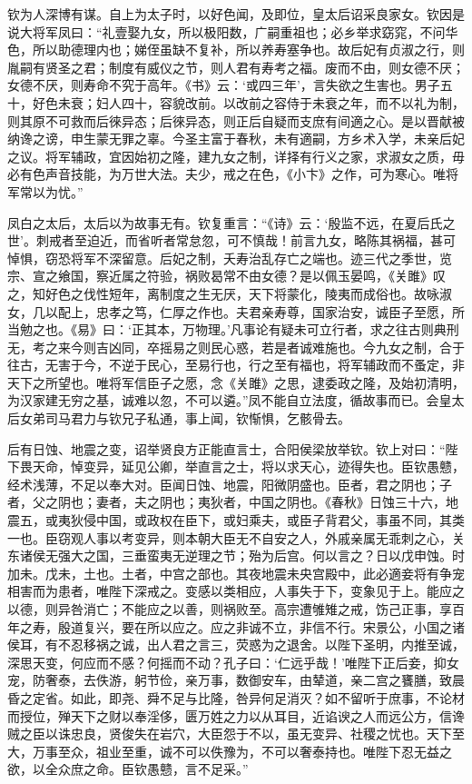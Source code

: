 \documentclass[12pt,UTF8]{ctexbook}
\begin{document}
钦为人深博有谋。自上为太子时，以好色闻，及即位，皇太后诏采良家女。钦因是说大将军凤曰：“礼壹娶九女，所以极阳数，广嗣重祖也；必乡举求窈窕，不问华色，所以助德理内也；娣侄虽缺不复补，所以养寿塞争也。故后妃有贞淑之行，则胤嗣有贤圣之君；制度有威仪之节，则人君有寿考之福。废而不由，则女德不厌；女德不厌，则寿命不究于高年。《书》云：‘或四三年’，言失欲之生害也。男子五十，好色未衰；妇人四十，容貌改前。以改前之容侍于未衰之年，而不以礼为制，则其原不可救而后徠异态；后徠异态，则正后自疑而支庶有间適之心。是以晋献被纳谗之谤，申生蒙无罪之辜。今圣主富于春秋，未有適嗣，方乡术入学，未亲后妃之议。将军辅政，宜因始初之隆，建九女之制，详择有行义之家，求淑女之质，毋必有色声音技能，为万世大法。夫少，戒之在色，《小卞》之作，可为寒心。唯将军常以为忧。”



凤白之太后，太后以为故事无有。钦复重言：“《诗》云：‘殷监不远，在夏后氏之世’。刺戒者至迫近，而省听者常怠忽，可不慎哉！前言九女，略陈其祸福，甚可悼惧，窃恐将军不深留意。后妃之制，夭寿治乱存亡之端也。迹三代之季世，览宗、宣之飨国，察近属之符验，祸败曷常不由女德？是以佩玉晏鸣，《关雎》叹之，知好色之伐性短年，离制度之生无厌，天下将蒙化，陵夷而成俗也。故咏淑女，几以配上，忠孝之笃，仁厚之作也。夫君亲寿尊，国家治安，诚臣子至愿，所当勉之也。《易》曰：‘正其本，万物理。’凡事论有疑未可立行者，求之往古则典刑无，考之来今则吉凶同，卒摇易之则民心惑，若是者诚难施也。今九女之制，合于往古，无害于今，不逆于民心，至易行也，行之至有福也，将军辅政而不蚤定，非天下之所望也。唯将军信臣子之愿，念《关雎》之思，逮委政之隆，及始初清明，为汉家建无穷之基，诚难以忽，不可以遴。”凤不能自立法度，循故事而已。会皇太后女弟司马君力与钦兄子私通，事上闻，钦惭惧，乞骸骨去。



后有日蚀、地震之变，诏举贤良方正能直言士，合阳侯梁放举钦。钦上对曰：“陛下畏天命，悼变异，延见公卿，举直言之士，将以求天心，迹得失也。臣钦愚戆，经术浅薄，不足以奉大对。臣闻日蚀、地震，阳微阴盛也。臣者，君之阴也；子者，父之阴也；妻者，夫之阴也；夷狄者，中国之阴也。《春秋》日蚀三十六，地震五，或夷狄侵中国，或政权在臣下，或妇乘夫，或臣子背君父，事虽不同，其类一也。臣窃观人事以考变异，则本朝大臣无不自安之人，外戚亲属无乖刺之心，关东诸侯无强大之国，三垂蛮夷无逆理之节；殆为后宫。何以言之？日以戊申蚀。时加未。戊未，土也。土者，中宫之部也。其夜地震未央宫殿中，此必適妾将有争宠相害而为患者，唯陛下深戒之。变感以类相应，人事失于下，变象见于上。能应之以德，则异咎消亡；不能应之以善，则祸败至。高宗遭雊雉之戒，饬己正事，享百年之寿，殷道复兴，要在所以应之。应之非诚不立，非信不行。宋景公，小国之诸侯耳，有不忍移祸之诚，出人君之言三，荧惑为之退舍。以陛下圣明，内推至诚，深思天变，何应而不感？何摇而不动？孔子曰：‘仁远乎哉！’唯陛下正后妾，抑女宠，防奢泰，去佚游，躬节俭，亲万事，数御安车，由辇道，亲二宫之饔膳，致晨昏之定省。如此，即尧、舜不足与比隆，咎异何足消灭？如不留听于庶事，不论材而授位，殚天下之财以奉淫侈，匮万姓之力以从耳目，近谄谀之人而远公方，信谗贼之臣以诛忠良，贤俊失在岩穴，大臣怨于不以，虽无变异、社稷之忧也。天下至大，万事至众，祖业至重，诚不可以佚豫为，不可以奢泰持也。唯陛下忍无益之欲，以全众庶之命。臣钦愚戆，言不足采。”
\end{document}
